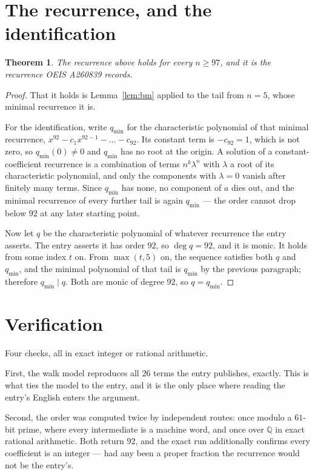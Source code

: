 \documentclass[11pt,a4paper]{article}
\theoremstyle{plain}
\newtheorem{theorem}{Theorem}
\theoremstyle{definition}
\begin{document}
\section{The recurrence, and the identification}

\begin{theorem}
The recurrence above holds for every $n\ge97$, and it is the recurrence OEIS A260839 records.
\end{theorem}

\begin{proof}
That it holds is Lemma~\ref{lem:bm} applied to the tail from $n=5$, whose minimal
recurrence it is.

For the identification, write $q_{\min}$ for the characteristic polynomial of that minimal
recurrence, $x^{92}-c_1x^{92-1}-\dots-c_{92}$. Its constant term is
$-c_{92}=1$, which is not zero, so $q_{\min}(0)\neq0$ and $q_{\min}$ has no
root at the origin. A solution of a constant-coefficient recurrence is a combination of terms
$n^{k}\lambda^{n}$ with $\lambda$ a root of its characteristic polynomial, and only the
components with $\lambda=0$ vanish after finitely many terms. Since $q_{\min}$ has none, no
component of $a$ dies out, and the minimal recurrence of every further tail is again
$q_{\min}$ --- the order cannot drop below $92$ at any later starting point.

Now let $q$ be the characteristic polynomial of whatever recurrence the entry asserts. The
entry asserts it has order $92$, so $\deg q=92$, and it is monic. It holds from some
index $t$ on. From $\max(t,5)$ on, the sequence satisfies both $q$ and $q_{\min}$, and
the minimal polynomial of that tail is $q_{\min}$ by the previous paragraph; therefore
$q_{\min}\mid q$. Both are monic of degree $92$, so $q=q_{\min}$.
\end{proof}

\section{Verification}

Four checks, all in exact integer or rational arithmetic.

First, the walk model reproduces all $26$ terms the entry publishes, exactly. This is
what ties the model to the entry, and it is the only place where reading the entry's English
enters the argument.

Second, the order was computed twice by independent routes: once modulo a $61$-bit prime, where
every intermediate is a machine word, and once over $\mathbb{Q}$ in exact rational arithmetic.
Both return $92$, and the exact run additionally confirms every coefficient is an integer
--- had any been a proper fraction the recurrence would not be the entry's.
\end{document}
